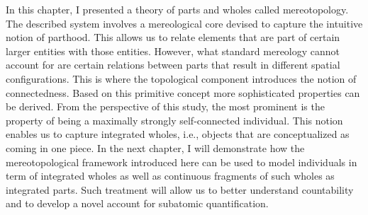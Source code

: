 In this chapter, I presented a theory of parts and wholes called mereotopology. The described system involves a mereological core devised to capture the intuitive notion of parthood. This allows us to relate elements that are part of certain larger entities with those entities. However, what standard mereology cannot account for are certain relations between parts that result in different spatial configurations. This is where the topological component introduces the notion of connectedness. Based on this primitive concept more sophisticated properties can be derived. From the perspective of this study, the most prominent is the property of being a maximally strongly self-connected individual. This notion enables us to capture integrated wholes, i.e., objects that are conceptualized as coming in one piece. In the next chapter, I will demonstrate how the mereotopological framework introduced here can be used to model individuals in term of integrated wholes as well as continuous fragments of such wholes as integrated parts. Such treatment will allow us to better understand countability and to develop a novel account for subatomic quantification.

